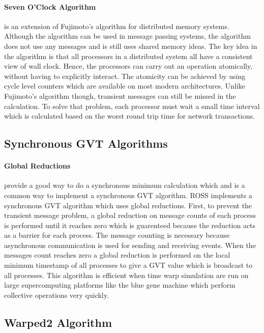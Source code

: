\documentclass[11pt]{book}
\begin{document}
\paragraph{Seven O'Clock Algorithm}\cite{bauer-05} is an extension of Fujimoto's algorithm
for distributed memory systems. Although the algorithm can be used in message passing systems,
the algorithm does not use any messages and is still uses shared memory ideas. The key idea
in the algorithm is that all processors in a distributed system all have a consistent view
of wall clock. Hence, the processors can carry out an operation atomically, without having
to explicitly interact. The atomicity can be achieved by using cycle level counters which
are available on most modern architectures. Unlike Fujimoto's algorithm though, transient
messages can still be missed in the calculation. To solve that problem, each processor must
wait a small time interval which is calculated based on the worst round trip time for
network transactions.

\subsection{Synchronous GVT Algorithms}

\paragraph{Global Reductions} provide a good way to do a synchronous minimum calculation
which and is a common way to implement a synchronous GVT algorithm. ROSS implements a
synchronous GVT algorithm which uses global reductions\cite{holder-08}. First, to prevent
the transient message problem, a global reduction on message counts of each process is
performed until it reaches zero which is guarenteed because the reduction acts as a barrier
for each process. The message counting is necessary because asynchronous communication is
used for sending and receiving events. When the messages count reaches zero a global
reduction is performed on the local minimum timestamp of all processes to give a GVT value
which is broadcast to all processes. This algorithm is efficient when time warp simulation
are run on large supercomputing platforms like the blue gene machine which perform collective
operations very quickly.

\subsection{Warped2 Algorithm}
\end{document}
